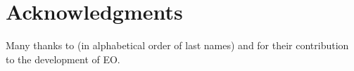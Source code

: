
\section{Acknowledgments}

Many thanks to (in alphabetical order of last names)
  and
  for their contribution to the development of EO.
